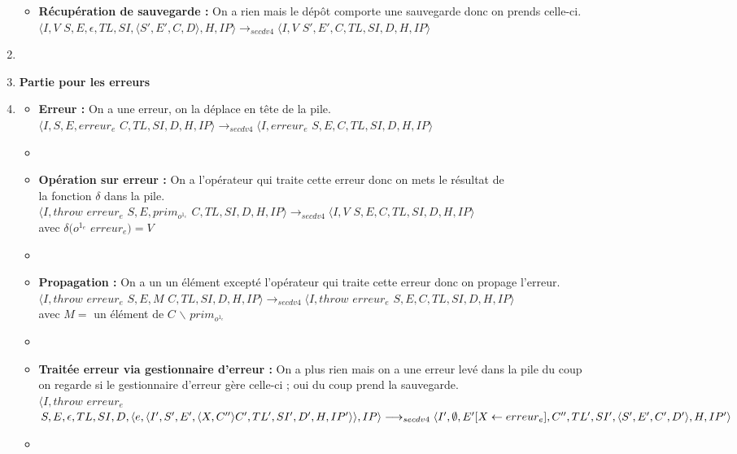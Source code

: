 \documentclass[10pt,a4paper]{article}
\begin{document}
\begin{enumerate}
\begin{itemize}
					\item[] \textbf{Récupération de sauvegarde :}  On a rien mais le dépôt comporte une sauvegarde donc on prends celle-ci.
					\\  $\langle I,V$ $S,E,\epsilon,TL,SI,\langle S',E',C,D\rangle,H,IP\rangle
					\longrightarrow_{secdv4} \langle I,V$ $S',E',C,TL,SI,D,H,IP\rangle$
				\end{itemize}
				\item[]
			
			    
			    
			    \item[] \textbf{Partie pour les erreurs} 
			    \item[]
			    \begin{itemize}
			    	\item[] \textbf{Erreur :} On a une erreur, on la déplace en tête de la pile.
			    	\\$\langle I,S,E,erreur_{e}$ $C,TL,SI,D,H,IP\rangle
			    	\longrightarrow_{secdv4} \langle I,erreur_{e}$ $S,E,C,TL,SI,D,H,IP\rangle$
			    	\item[]
			    	
			    	\item[] \textbf{Opération sur erreur :} On a l'opérateur qui traite cette erreur donc on mets le résultat de 
			    	\\la fonction $\delta$ dans la pile.
			    	\\$\langle I,throw$ $erreur_{e}$ $S,E,prim_{o^{1_{e}}}$ $C,TL,SI,D,H,IP\rangle
			    	\longrightarrow_{secdv4} \langle I,V$ $S,E,C,TL,SI,D,H,IP\rangle$
			    	\\ avec $\delta(o^{1_{e}}$ $erreur_{e}) = V$
			    	\item[]
			    	
			    	\item[] \textbf{Propagation :} On a un un élément excepté l'opérateur qui traite cette erreur donc on propage l'erreur.
			    	\\ $\langle I,throw$ $erreur_{e}$ $S,E,M$ $C,TL,SI,D,H,IP\rangle
			    	\longrightarrow_{secdv4} \langle I,throw$ $erreur_{e}$ $S,E,C,TL,SI,D,H,IP\rangle$ 
			    	\\avec $M = $ un élément de $C$ $\backslash$ $prim_{o^{1_{e}}}$
			    	\item[]
			    	
			    	\item[] \textbf{Traitée erreur via gestionnaire d'erreur :} On a plus rien mais on a une erreur levé dans la pile du coup 
			    	\\ on regarde si le gestionnaire d'erreur gère celle-ci ; oui du coup prend la sauvegarde.
			    	\\ $\langle I,throw$ $erreur_{e}$ $S,E,\epsilon,TL,SI,D,\langle e,\langle I',S',E',\langle X,C'' \rangle C',TL',SI',D',H,IP'\rangle\rangle,IP\rangle \\\longrightarrow_{secdv4} \langle I',\emptyset,E'[X \leftarrow erreur_{e}],C'',TL',SI',\langle S',E',C',D'\rangle,H,IP'\rangle$
			    	\item[]
			    	

\end{itemize}
\end{enumerate}
\end{document}
